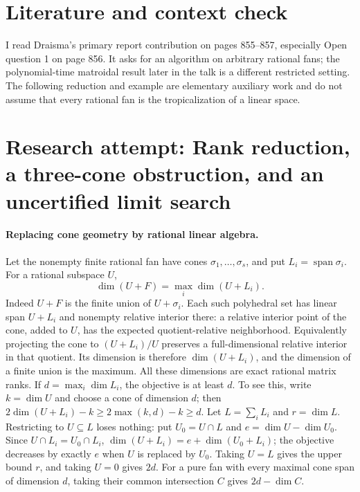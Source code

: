 \documentclass[11pt]{article}
\begin{document}
\section{Literature and context check}

I read Draisma's primary report contribution on pages 855--857, especially Open
question 1 on page 856. It asks for an algorithm on arbitrary rational fans;
the polynomial-time matroidal result later in the talk is a different restricted
setting. The following reduction and example are elementary auxiliary work and
do not assume that every rational fan is the tropicalization of a linear space.

\section{Research attempt: Rank reduction, a three-cone obstruction, and an uncertified limit search}

\paragraph{Replacing cone geometry by rational linear algebra.}
Let the nonempty finite rational fan have cones $\sigma_1,\ldots,\sigma_s$,
and put $L_i=\operatorname{span}\sigma_i$. For a rational subspace $U$,
\[
 \dim(U+F)=\max_i\dim(U+L_i).
\]
Indeed $U+F$ is the finite union of $U+\sigma_i$. Each such polyhedral set
has linear span $U+L_i$ and nonempty relative interior there: a relative
interior point of the cone, added to $U$, has the expected quotient-relative
neighborhood. Equivalently projecting the cone to $(U+L_i)/U$ preserves a
full-dimensional relative interior in that quotient. Its dimension is therefore
$\dim(U+L_i)$, and the dimension of a finite union is the maximum.
All these dimensions are exact rational matrix ranks.
If $d=\max_i\dim L_i$, the objective is at least $d$. To see this, write
$k=\dim U$ and choose a cone of dimension $d$; then
$2\dim(U+L_i)-k\geq2\max(k,d)-k\geq d$.
Let $L=\sum_iL_i$ and $r=\dim L$. Restricting to $U\subseteq L$ loses
nothing: put $U_0=U\cap L$ and $e=\dim U-\dim U_0$. Since
$U\cap L_i=U_0\cap L_i$,
$\dim(U+L_i)=e+\dim(U_0+L_i)$; the objective decreases by exactly $e$
when $U$ is replaced by $U_0$.
Taking $U=L$ gives the upper bound $r$, and taking $U=0$ gives $2d$.
For a pure fan with every maximal cone span of dimension $d$, taking their
common intersection $C$ gives $2d-\dim C$.
\end{document}
